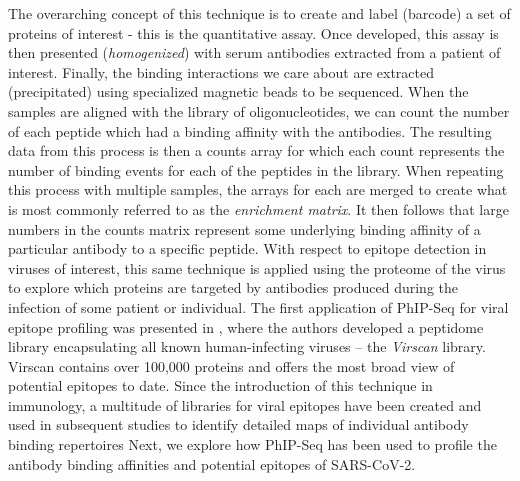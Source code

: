 \documentclass{article}
\begin{document}
The overarching concept of this technique is to create and label (barcode) a set of proteins of interest - this is the quantitative assay.
Once developed, this assay is then presented (\textit{homogenized}) with serum antibodies extracted from a patient of interest.
Finally, the binding interactions we care about are extracted (precipitated) using specialized magnetic beads to be sequenced.
When the samples are aligned with the library of oligonucleotides, we can count the number of each peptide which had a binding affinity with the antibodies.
The resulting data from this process is then a counts array for which each count represents the number of binding events for each of the peptides in the library.
When repeating this process with multiple samples, the arrays for each are merged to create what is most commonly referred to as the \textit{enrichment matrix}.
It then follows that large numbers in the counts matrix represent some underlying binding affinity of a particular antibody to a specific peptide.
With respect to epitope detection in viruses of interest, this same technique is applied using the proteome of the virus to explore which proteins are targeted by antibodies produced during the infection of some patient or individual.
The first application of PhIP-Seq for viral epitope profiling was presented in \citet{Xu2015}, where the authors developed a peptidome library encapsulating all known human-infecting viruses -- the \textit{Virscan} library.
Virscan contains over 100,000 proteins and offers the most broad view of potential epitopes to date.
Since the introduction of this technique in immunology, a multitude of libraries for viral epitopes have been created and used in subsequent studies to identify detailed maps of individual antibody binding repertoires 
Next, we explore how PhIP-Seq has been used to profile the antibody binding affinities and potential epitopes of SARS-CoV-2.
\end{document}

